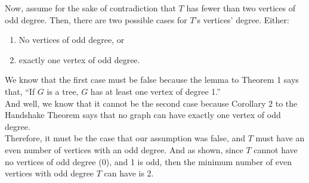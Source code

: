 \documentclass[10pt]{article}
\begin{document}
\begin{enumerate}
{              Now, assume for the sake of contradiction that $T$ has fewer than two vertices of odd degree. Then, there are two possible cases for $T$'s vertices' degree. Either:
              \begin{enumerate}
                  \item No vertices of odd degree, or
                  \item exactly one vertex of odd degree.
              \end{enumerate}
              We know that the first case must be false because the lemma to Theorem 1 says that, ``If $G$ is a tree, $G$ has at least one vertex of degree 1.'' \\
              And well, we know that it cannot be the second case because Corollary 2 to the Handshake Theorem says that no graph can have exactly one vertex of odd degree. \\

              Therefore, it must be the case that our assumption was false, and $T$ must have an even number of vertices with an odd degree. And as shown, since $T$ cannot have no vertices of odd degree (0), and 1 is odd, then the minimum number of even vertices with odd degree $T$ can have is 2.
          }
\end{enumerate}
\end{document}
